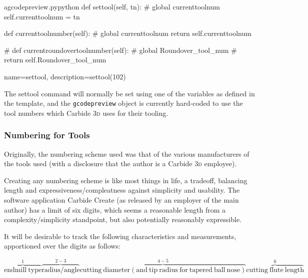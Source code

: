 \documentclass{ltxdoc}
\begin{document}
 
\lstset{firstnumber=\thegcpy}
\begin{writecode}{a}{gcodepreview.py}{python}
    def settool(self, tn):
#        global currenttoolnum
        self.currenttoolnum = tn

    def currenttoolnumber(self):
#        global currenttoolnum
        return self.currenttoolnum

#    def currentroundovertoolnumber(self):
#        global Roundover_tool_num
#        return self.Roundover_tool_num

\end{writecode}
\addtocounter{gcpy}{12}

{
    name=settool, 
    description={settool(102)}
}

The \gls{settool} command will normally be set using one of the variables as defined in the template, and the \verb|gcodepreview| object is currently hard-coded to use the tool numbers which Carbide \textsc{3d} uses for their tooling.

\subsubsection{Numbering for Tools}

Originally, the numbering scheme used was that of the various manufacturers of the tools used (with a disclosure that the author is a Carbide \textsc{3d} employee).

Creating any numbering scheme is like most things in life, a tradeoff, balancing length and expressiveness/compleatness against simplicity and usability. The software application Carbide Create (as released by an employer of the main author) has a limit of six digits, which seems a reasonable length from a complexity/simplicity standpoint, but also potentially reasonably expressible.

It will be desirable to track the following characteristics and measurements, apportioned over the digits as follows:

\begin{equation*}
\overbrace{\mathrm{endmill\ type}}^1
\overbrace{\mathrm{radius/angle}}^{2-3}
\overbrace{\mathrm{cutting\ diameter (and\ tip\ radius\ for\ tapered\ ball\ nose)}}^{4-5}
\overbrace{\mathrm{cutting\ flute\ length}}^6
\end{equation*}
\end{document}
